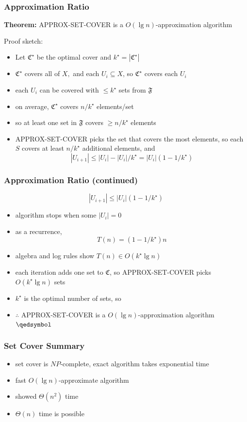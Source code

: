 \documentclass[10pt,aspectratio=169]{beamer}
\begin{document}
\begin{frame} \frametitle{Approximation Ratio}
\textbf{Theorem:} APPROX-SET-COVER is a $O(\lg n)$-approximation algorithm

Proof sketch:
\begin{itemize}
  \item Let $\mathfrak{C}^\star$ be the optimal cover and $k^\star=|\mathfrak{C}^\star|$
  \item $\mathfrak{C}^\star$ covers all of $X,$ and each $U_i \subseteq X$, so $\mathfrak{C}^\star$ covers each $U_i$
  \item each $U_i$ can be covered with $\leq k^\star$ sets from $\mathfrak{F}$
  \item on average, $\mathfrak{C}^\star$ covers $n/k^\star$ elements/set
  \item so at least one set in $\mathfrak{F}$ covers $\geq n/k^\star$ elements
  \item APPROX-SET-COVER picks the set that covers the most elements, so each $S$ covers at least $n/k^\star$ additional elements,
    and \[ |U_{i+1}| \leq |U_i| - |U_i|/k^\star = |U_i|(1-1/k^\star) \]
\end{itemize}
\end{frame}

\begin{frame} \frametitle{Approximation Ratio (continued)}
  \[ |U_{i+1}| \leq |U_i|(1-1/k^\star) \]
  \begin{itemize}
    \item algorithm stops when some $|U_i|=0$
    \item as a recurrence,
      \[ T(n) = (1-1/k^\star)n \]
    \item algebra and log rules show $T(n) \in O(k^\star \lg n)$
    \item each iteration adds one set to $\mathfrak{C}$, so APPROX-SET-COVER picks $O(k^\star \lg n)$ sets
    \item $k^\star$ is the optimal number of sets, so
    \item $\therefore$ APPROX-SET-COVER is a $O(\lg n)$-approximation algorithm $\qedsymbol$
  \end{itemize}
  \end{frame}
  
\begin{frame} \frametitle{Set Cover Summary}
\begin{itemize}
  \item set cover is $NP$-complete, exact algorithm takes exponential time
  \item fast $O(\lg n)$-approximate algorithm
  \item showed $\Theta(n^2)$ time
  \item $\Theta(n)$ time is possible
\end{itemize}
\end{frame}
\end{document}
